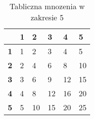 \begin{table}[htbp]
\centering
\begin{tabular}{|l|l|l|l|l|l|}
\hline
           & \textbf{1} & \textbf{2} & \textbf{3} & \textbf{4} & \textbf{5} \\ \hline
\textbf{1} & 1          & 2          & 3          & 4          & 5          \\ \hline
\textbf{2} & 2          & 4          & 6          & 8          & 10         \\ \hline
\textbf{3} & 3          & 6          & 9          & 12         & 15         \\ \hline
\textbf{4} & 4          & 8          & 12         & 16         & 20         \\ \hline
\textbf{5} & 5          & 10         & 15         & 20         & 25         \\ \hline
\end{tabular}
\label{tab:mnoz}
\caption{Tabliczna mnozenia w zakresie 5 }
\end{table}